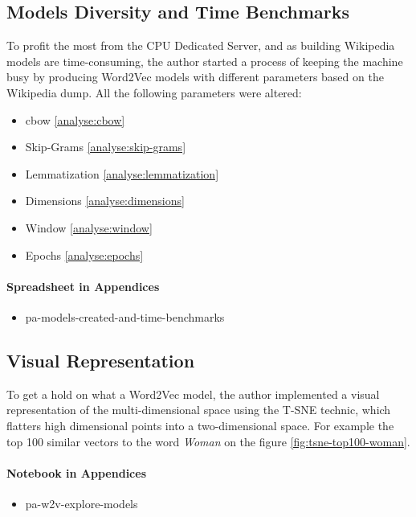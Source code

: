 \subsection{Models Diversity and Time Benchmarks}
To profit the most from the CPU Dedicated Server, and as building Wikipedia models are time-consuming, the author started a process of keeping the machine busy by producing Word2Vec models with different parameters based on the Wikipedia dump. All the following parameters were altered:

\begin{itemize}
    \setlength\itemsep{0em}
    \item \gls{cbow} \ref{analyse:cbow}
    \item Skip-Grams \ref{analyse:skip-grams}
    \item Lemmatization \ref{analyse:lemmatization}
    \item Dimensions \ref{analyse:dimensions}
    \item Window \ref{analyse:window}
    \item Epochs \ref{analyse:epochs}
\end{itemize}

\paragraph{Spreadsheet in Appendices}
\begin{itemize}
    \setlength\itemsep{0em}
    \item pa-models-created-and-time-benchmarks
\end{itemize}


\subsection{Visual Representation}
To get a hold on what a Word2Vec model, the author implemented a visual representation of the multi-dimensional space using the T-SNE \cite{article:tsne} technic, which flatters high dimensional points into a two-dimensional space. For example the top 100 similar vectors to the word \textit{Woman} on the figure \ref{fig:tsne-top100-woman}.

\paragraph{Notebook in Appendices}
\begin{itemize}
    \setlength\itemsep{0em}
    \item pa-w2v-explore-models
\end{itemize}

